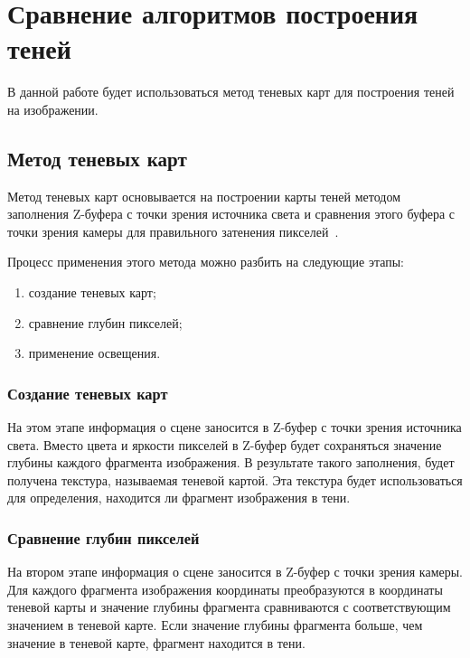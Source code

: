 \section{Сравнение алгоритмов построения теней}

В данной работе будет использоваться метод теневых карт для построения теней на изображении.

\subsection*{Метод теневых карт}

Метод теневых карт основывается на построении карты теней методом заполнения Z-буфера с точки зрения источника света и сравнения этого буфера с точки зрения камеры для правильного затенения пикселей~\cite{Shadows}.

Процесс применения этого метода можно разбить на следующие этапы:

\begin{enumerate}
    \item создание теневых карт;
    \item сравнение глубин пикселей;    
    \item применение освещения.
\end{enumerate}

\subsubsection*{Создание теневых карт}

На этом этапе информация о сцене заносится в Z-буфер с точки зрения источника света. Вместо цвета и яркости пикселей в Z-буфер будет сохраняться значение глубины каждого фрагмента изображения. В результате такого заполнения, будет получена текстура, называемая теневой картой. Эта текстура будет использоваться для определения, находится ли фрагмент изображения в тени.

\subsubsection*{Сравнение глубин пикселей} 

На втором этапе информация о сцене заносится в Z-буфер с точки зрения камеры. Для каждого фрагмента изображения координаты преобразуются в координаты теневой карты и значение глубины фрагмента сравниваются  с соответствующим значением в теневой карте. 
Если значение глубины фрагмента больше, чем значение в теневой карте, фрагмент находится в тени.

